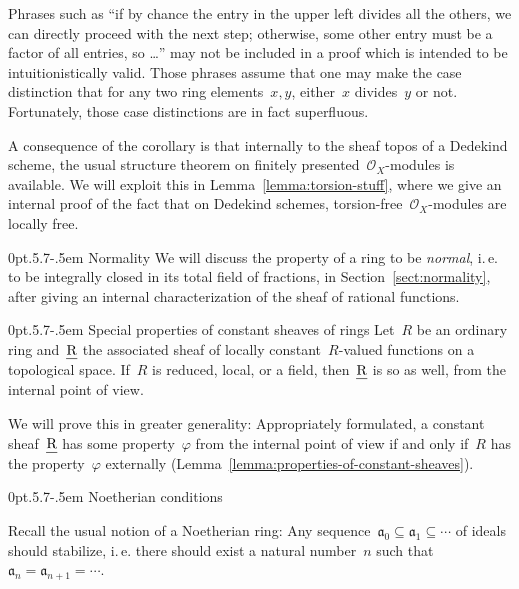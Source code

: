 \documentclass[10pt,reqno,a4paper]{amsbook}
\makeatletter
\theoremstyle{definition}
\theoremstyle{plain}
\theoremstyle{remark}
\renewcommand{\O}{\mathcal{O}}
\newcommand{\aaa}{\mathfrak{a}}
\let\oldul\ul
\renewcommand{\ul}[1]{\text{\oldul{$#1$}}}
\newcommand{\?}{\,{:}\,}
\renewcommand{\_}{\mathpunct{.}\,}
\newcommand{\ie}{i.\,e.\@\xspace}
\def\subsection{\@startsection{subsection}{2}%
  {0pt}{.5\linespacing\@plus.7\linespacing}{-.5em}%
  {\normalfont\bfseries}}
\makeatother
\begin{document}
Phrases such as ``if by chance the entry in the upper left divides
all the others, we can directly proceed with the next step; otherwise, some
other entry must be a factor of all entries, so \ldots'' may not be included in
a proof which is intended to be intuitionistically valid.
Those phrases assume that one may make the case distinction that for
any two ring elements~$x,y$, either~$x$ divides~$y$ or not. Fortunately, those
case distinctions are in fact superfluous.

A consequence of the corollary is that internally to the sheaf topos of a
Dedekind scheme, the usual structure theorem on finitely
presented~$\O_X$-modules is available. We will exploit this in
Lemma~\ref{lemma:torsion-stuff}, where we give an internal proof of the
fact that on Dedekind schemes, torsion-free~$\O_X$-modules are locally free.


\subsection{Normality} We will discuss the property of a ring to be
\emph{normal}, \ie to be integrally closed in its total field of
fractions, in Section~\ref{sect:normality}, after giving an internal
characterization of the sheaf of rational functions.


\subsection{Special properties of constant sheaves of rings} Let~$R$ be an
ordinary ring and~$\ul{R}$ the associated sheaf of locally constant~$R$-valued
functions on a topological space. If~$R$ is reduced, local, or a field,
then~$\ul{R}$ is so as well, from the internal point of view.

We will prove this in greater generality: Appropriately formulated, a constant
sheaf~$\ul{R}$ has some property~$\varphi$ from the internal point of view if
and only if~$R$ has the property~$\varphi$ externally
(Lemma~\ref{lemma:properties-of-constant-sheaves}).


\subsection{Noetherian conditions}
\label{sect:noetherian}

Recall the usual notion of a Noetherian ring: Any sequence~$\aaa_0 \subseteq
\aaa_1 \subseteq \cdots$ of ideals should stabilize, \ie there should exist a
natural number~$n$ such that~$\aaa_n = \aaa_{n+1} = \cdots$.
\end{document}
